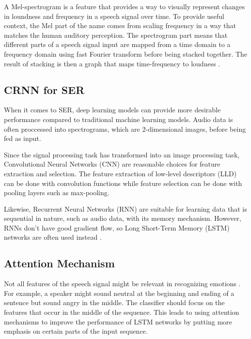 \documentclass[../main.tex]{subfiles}
\begin{document}
A Mel-spectrogram is a feature that provides a way to visually represent changes in loundness 
and frequency in a speech signal over time. To provide useful context, the 
Mel part of the name comes from scaling frequency in a way that matches 
the human auditory perception. The spectrogram part means that different parts of a speech 
signal input are mapped from a time domain to a frequency domain using 
fast Fourier transform before being stacked together. The result of stacking is 
then a graph that maps time-frequency to loudness \citep{Roberts2020}. 

\subsection{CRNN for SER} 
When it comes to SER, deep learning models can provide more desirable 
performance compared to traditional machine learning models. Audio data is 
often proccessed into spectrograms, which are 2-dimensional images, before 
being fed as input. 

Since the signal processing task has transformed into an image 
processing task, Convolutional Neural Networks (CNN) are reasonable
choices for feature extraction and selection. The feature extraction of 
low-level descriptors (LLD) can be done with convolution functions while 
feature selection can be done with pooling layers such as max-pooling.

Likewise, Recurrent Neural Networks (RNN) are suitable for learning data 
that is sequential in nature, such as audio data, with its memory mechanism. 
However, RNNs don't have good gradient flow, so Long Short-Term Memory (LSTM)
networks are often used instead \citep{Hashem2023}.


\subsection{Attention Mechanism} 
Not all features of the speech signal might 
be relevant in recognizing emotions \citep{Hashem2023}. For example, a speaker might sound neutral 
at the beginning and ending of a sentence but sound angry in the middle. The 
classifier should focus on the features that occur in the middle of the 
sequence. This leads to using attention mechanisms to improve the performance 
of LSTM networks by putting more emphasis on certain parts of the input 
sequence.
\end{document}
